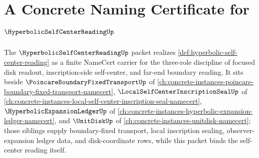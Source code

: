 \chapter{A Concrete Naming Certificate for $\HyperbolicSelfCenterReadingUp$}
\label{ch:concrete-instances-hyperbolic-self-center-reading-namecert}

The $\HyperbolicSelfCenterReadingUp$ packet realizes \autoref{def:hyperbolic-self-center-reading} as a finite NameCert carrier for the three-role discipline of focused disk readout, inscription-side self-center, and far-end boundary reading. It sits beside $\PoincareBoundaryFixedTransportUp$ of \autoref{ch:concrete-instances-poincare-boundary-fixed-transport-namecert}, $\LocalSelfCenterInscriptionSealUp$ of \autoref{ch:concrete-instances-local-self-center-inscription-seal-namecert}, $\HyperbolicExpansionLedgerUp$ of \autoref{ch:concrete-instances-hyperbolic-expansion-ledger-namecert}, and $\UnitDiskUp$ of \autoref{ch:concrete-instances-unitdisk-namecert}; those siblings supply boundary-fixed transport, local inscription sealing, observer-expansion ledger data, and disk-coordinate rows, while this packet binds the self-center reading itself.

